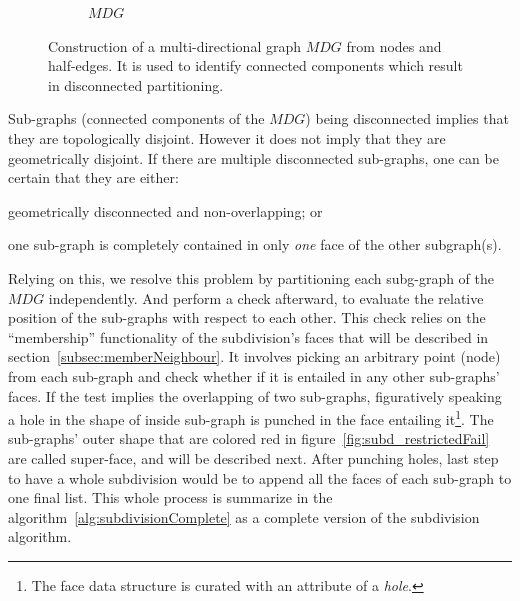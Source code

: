 \begin{figure}
\begin{subfigure}{.32\textwidth}
    \caption{$\mathit{MDG}$} \label{subfig:subd_mdg_c}
  \end{subfigure}%
  \caption[xxx]
          {Construction of a multi-directional graph $\mathit{MDG}$ from nodes and half-edges.
          It is used to identify connected components which result in disconnected partitioning.}
  \label{fig:subd_mdg}
\end{figure}

Sub-graphs (connected components of the $\mathit{MDG}$) being disconnected implies that they are topologically disjoint.
However it does not imply that they are geometrically disjoint.
If there are multiple disconnected sub-graphs, one can be certain that they are either:
\begin{inparaenum}
  \item geometrically disconnected and non-overlapping; or
  \item one sub-graph is completely contained in only \emph{one} face of the other subgraph(s).
\end{inparaenum}
Relying on this, we resolve this problem by partitioning each subg-graph of the $\mathit{MDG}$ independently.
And perform a check afterward, to evaluate the relative position of the sub-graphs with respect to each other.
This check relies on the ``membership'' functionality of the subdivision's faces that will be described in section~\ref{subsec:memberNeighbour}.
It involves picking an arbitrary point (node) from each sub-graph and check whether if it is entailed in any other sub-graphs' faces.
If the test implies the overlapping of two sub-graphs, figuratively speaking a hole in the shape of inside sub-graph is punched in the face entailing it\footnote{The face data structure is curated with an attribute of a \emph{hole}.}.
The sub-graphs' outer shape that are colored red in figure~\ref{fig:subd_restrictedFail} are called super-face, and will be described next.
After punching holes, last step to have a whole subdivision would be to append all the faces of each sub-graph to one final list.
This whole process is summarize in the algorithm~\ref{alg:subdivisionComplete} as a complete version of the subdivision algorithm.

